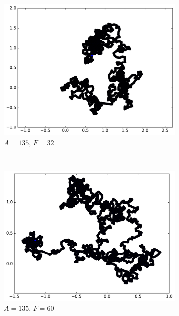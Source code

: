 \begin{appendices}
\begin{figure}[htbp]
\begin{subfigure}[t]{\subImgWmo}
			\includegraphics[width=\textwidth]{figures/ch3/synTraj_219_135_32}
			\caption[$A = 135$, $F=32$]{$A = 135$, $F=32$}
			\label{fig:synTraj_219_135_32}
		\end{subfigure}
		~
		\begin{subfigure}[t]{\subImgWmo}
			\centering
			\includegraphics[width=\textwidth]{figures/ch3/synTraj_219_135_60}
			\caption[$A = 135$, $F=60$]{$A = 135$, $F=60$}
			\label{fig:synTraj_219_135_60}
		\end{subfigure}
		~
		\begin{subfigure}[t]{\subImgWmo}
			\centering

\end{subfigure}
\end{figure}
\end{appendices}
